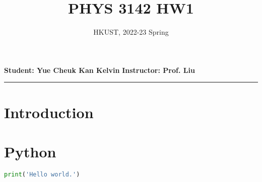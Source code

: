 \documentclass[a4paper, 12pt]{article}
\title{\textbf{PHYS 3142 HW1}}
\author{HKUST, 2022-23 Spring}
\date{\vspace{-5ex}}
\begin{document}
\maketitle

\begin{center}
\textbf{Student: Yue Cheuk Kan Kelvin}
\hfill
\textbf{Instructor: Prof. Liu} 
\rule{16.5cm}{1pt}
\end{center}

\section*{Introduction}

\section{Python}
\begin{lstlisting}[language=Python, caption=Python]
print('Hello world.')
\end{lstlisting}
\end{document}

